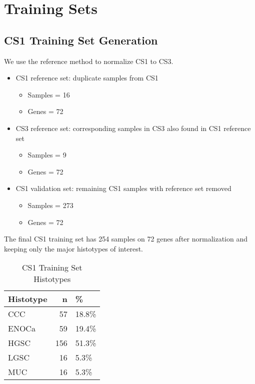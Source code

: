 \documentclass[
]{report}
\providecommand{\tightlist}{%
  \setlength{\itemsep}{0pt}\setlength{\parskip}{0pt}}
\begin{document}
\hypertarget{training-sets}{%
\section{Training Sets}\label{training-sets}}

\hypertarget{cs1-training-set-generation}{%
\subsection{CS1 Training Set Generation}\label{cs1-training-set-generation}}

We use the reference method to normalize CS1 to CS3.

\begin{itemize}
\item
  CS1 reference set: duplicate samples from CS1

  \begin{itemize}
  \tightlist
  \item
    Samples = 16
  \item
    Genes = 72
  \end{itemize}
\item
  CS3 reference set: corresponding samples in CS3 also found in CS1 reference set

  \begin{itemize}
  \tightlist
  \item
    Samples = 9
  \item
    Genes = 72
  \end{itemize}
\item
  CS1 validation set: remaining CS1 samples with reference set removed

  \begin{itemize}
  \tightlist
  \item
    Samples = 273
  \item
    Genes = 72
  \end{itemize}
\end{itemize}

The final CS1 training set has 254 samples on 72 genes after normalization and keeping only the major histotypes of interest.

\begin{table}

\caption{\label{tab:training-dist-cs1}CS1 Training Set Histotypes}
\centering
\begin{tabular}[t]{l|r|l}
\hline
Histotype & n & \%\\
\hline
CCC & 57 & 18.8\%\\
\hline
ENOCa & 59 & 19.4\%\\
\hline
HGSC & 156 & 51.3\%\\
\hline
LGSC & 16 & 5.3\%\\
\hline
MUC & 16 & 5.3\%\\
\hline
\end{tabular}
\end{table}
\end{document}
